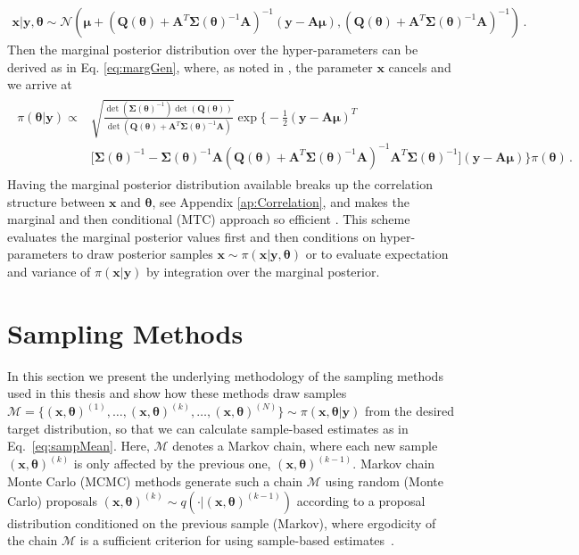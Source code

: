 \begin{align}
	\bm{x} | \bm{y}, \bm{\theta} \sim \mathcal{N}(\bm{\mu} + (\bm{Q}(\bm{\theta}) + \bm{A}^T \bm{\Sigma}(\bm{\theta})^{-1} \bm{A})^{-1}(\bm{y} - \bm{A}\bm{\mu}),(\bm{Q}(\bm{\theta}) + \bm{A}^T \bm{\Sigma}(\bm{\theta})^{-1} \bm{A})^{-1}) \, \label{eq:CondPostLin}.
\end{align}
Then the marginal posterior distribution over the hyper-parameters can be derived as in Eq. \ref{eq:margGen}, where, as noted in \cite{fox2016fast}, the parameter $\bm{x}$ cancels and we arrive at
\begin{align}\begin{split}
		\pi(\bm{\theta} | \bm{y}) \propto & \sqrt{\frac{\det{(\bm{\Sigma}(\bm{\theta})^{-1})} \det{(\bm{Q}(\bm{\theta}))} }{\det{(\bm{Q}(\bm{\theta}) + \bm{A}^T \bm{\Sigma}(\bm{\theta})^{-1} \bm{A})} } }  \exp \Bigg\{  -\frac{1}{2} (\bm{y} - \bm{A} \bm{\mu})^T \\ &\big[ \bm{\Sigma}(\bm{\theta})^{-1} - \bm{\Sigma}(\bm{\theta})^{-1} \bm{A}  (\bm{Q}(\bm{\theta}) + \bm{A}^T \bm{\Sigma}(\bm{\theta})^{-1} \bm{A})^{-1} \bm{A}^T \bm{\Sigma} (\bm{\theta})^{-1} \big] (\bm{y} - \bm{A} \bm{\mu}) \Bigg\} \pi(\bm{\theta}) \, .
	\end{split} 
\end{align} 
Having the marginal posterior distribution available breaks up the correlation structure between $\bm{x}$ and $\bm{\theta}$, see Appendix \ref{ap:Correlation}, and makes the marginal and then conditional (MTC) approach so efficient \cite{fox2016fast}.
This scheme evaluates the marginal posterior values first and then conditions on hyper-parameters to draw posterior samples $\bm{x} \sim \pi (\bm{x} | \bm{y}, \bm{\theta})$ or to evaluate expectation and variance of $\pi(\bm{x}| \bm{y})$ by integration over the marginal posterior.




\section{Sampling Methods}
\label{sec:sampling}
In this section we present the underlying methodology of the sampling methods used in this thesis and show how these methods draw samples \newline$ \mathcal{M} = \{ (\bm{x}, \bm{\theta} )^{(1)}, \dots, (\bm{x}, \bm{\theta} )^{(k)}, \dots, (\bm{x}, \bm{\theta})^{(N)} \} \sim \pi(\bm{x}, \bm{\theta} |  \bm{y})$ from the desired target distribution, so that we can calculate sample-based estimates as in Eq.~\ref{eq:sampMean}.
Here, $\mathcal{M}$ denotes a Markov chain, where each new sample $(\bm{x}, \bm{\theta})^{(k)}$ is only affected by the previous one, $(\bm{x}, \bm{\theta})^{(k-1)}$.
Markov chain Monte Carlo (MCMC) methods generate such a chain $\mathcal{M}$ using random (Monte Carlo) proposals $(\bm{x}, \bm{\theta})^{(k)} \sim q( \cdot |  (\bm{x}, \bm{\theta})^{(k-1)})$ according to a proposal distribution conditioned on the previous sample (Markov), where ergodicity of the chain $\mathcal{M}$ is a sufficient criterion for using sample-based estimates~\cite{tan2016LecNot, roberts2004general}.

